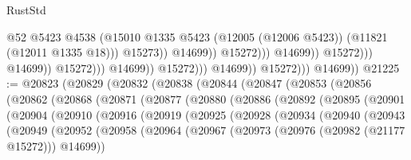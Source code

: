 \begin{lexlean}{RustStd}
\begin{coremodule}
                                                              @52
                                                              @5423
                                                              @4538
                                                              (@15010
                                                                @1335
                                                                @5423
                                                                (@12005 (@12006 @5423))
                                                                (@11821 (@12011 @1335 @18)))
                                                              @15273))
                                                          @14699))
                                                      @15272)))
                                                @14699))
                                            @15272)))
                                      @14699))
                                  @15272)))
                            @14699))
                        @15272)))
                  @14699))
              @15272)))
        @14699))
@21225 := @20823
    (@20829
      (@20832
        (@20838
          (@20844
            (@20847
              (@20853
                (@20856
                  (@20862
                    (@20868
                      (@20871
                        (@20877
                          (@20880
                            (@20886
                              (@20892
                                (@20895
                                  (@20901
                                    (@20904
                                      (@20910
                                        (@20916
                                          (@20919
                                            (@20925
                                              (@20928
                                                (@20934
                                                  (@20940
                                                    (@20943
                                                      (@20949
                                                        (@20952
                                                          (@20958
                                                            (@20964
                                                              (@20967
                                                                (@20973
                                                                  (@20976 (@20982 (@21177 @15272)))
                                                                  @14699))

\end{coremodule}
\end{lexlean}
